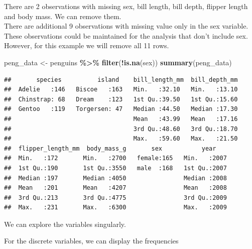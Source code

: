 \documentclass[
]{article}
\newenvironment{Shaded}{\begin{snugshade}}{\end{snugshade}}
\newcommand{\FunctionTok}[1]{\textcolor[rgb]{0.13,0.29,0.53}{\textbf{#1}}}
\newcommand{\NormalTok}[1]{#1}
\newcommand{\OtherTok}[1]{\textcolor[rgb]{0.56,0.35,0.01}{#1}}
\newcommand{\SpecialCharTok}[1]{\textcolor[rgb]{0.81,0.36,0.00}{\textbf{#1}}}
\begin{document}
There are 2 observations with missing sex, bill length, bill depth,
flipper length and body mass. We can remove them.\\
There are additional 9 observations with missing value only in the sex
variable. These observations could be maintained for the analysis that
don't include sex. However, for this example we will remove all 11 rows.

\begin{Shaded}
\begin{Highlighting}[]
\NormalTok{peng\_data }\OtherTok{\textless{}{-}}\NormalTok{ penguins }\SpecialCharTok{\%\textgreater{}\%} \FunctionTok{filter}\NormalTok{(}\SpecialCharTok{!}\FunctionTok{is.na}\NormalTok{(sex))}
\FunctionTok{summary}\NormalTok{(peng\_data)}
\end{Highlighting}
\end{Shaded}

\begin{verbatim}
##       species          island    bill_length_mm  bill_depth_mm  
##  Adelie   :146   Biscoe   :163   Min.   :32.10   Min.   :13.10  
##  Chinstrap: 68   Dream    :123   1st Qu.:39.50   1st Qu.:15.60  
##  Gentoo   :119   Torgersen: 47   Median :44.50   Median :17.30  
##                                  Mean   :43.99   Mean   :17.16  
##                                  3rd Qu.:48.60   3rd Qu.:18.70  
##                                  Max.   :59.60   Max.   :21.50  
##  flipper_length_mm  body_mass_g       sex           year     
##  Min.   :172       Min.   :2700   female:165   Min.   :2007  
##  1st Qu.:190       1st Qu.:3550   male  :168   1st Qu.:2007  
##  Median :197       Median :4050                Median :2008  
##  Mean   :201       Mean   :4207                Mean   :2008  
##  3rd Qu.:213       3rd Qu.:4775                3rd Qu.:2009  
##  Max.   :231       Max.   :6300                Max.   :2009
\end{verbatim}

We can explore the variables singularly.

For the discrete variables, we can display the frequencies
\end{document}

